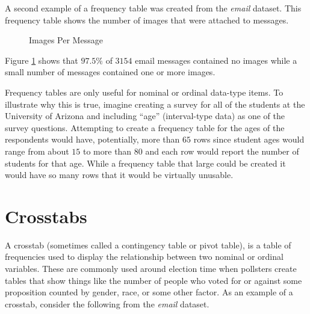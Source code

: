 A second example of a frequency table was created from the \textit{email} dataset. This frequency table shows the number of images that were attached to messages.

\begin{figure}[H]
  \begin{center}
    \caption{Images Per Message}
    \label{fre:img02}
  \end{center}
\end{figure}

Figure \ref{fre:img02} shows that $ 97.5\% $ of $ 3154 $ email messages contained no images while a small number of messages contained one or more images.

Frequency tables are only useful for nominal or ordinal data-type items. To illustrate why this is true, imagine creating a survey for all of the students at the University of Arizona and including ``age'' (interval-type data) as one of the survey questions. Attempting to create a frequency table for the ages of the respondents would have, potentially, more than $ 65 $ rows since student ages would range from about $ 15 $ to more than $ 80 $ and each row would report the number of students for that age. While a frequency table that large could be created it would have so many rows that it would be virtually unusable.

\section{Crosstabs}

A crosstab (sometimes called a contingency table or pivot table), is a table of frequencies used to display the relationship between two nominal or ordinal variables. These are commonly used around election time when pollsters create tables that show things like the number of people who voted for or against some proposition counted by gender, race, or some other factor. As an example of a crosstab, consider the following from the \textit{email} dataset.

